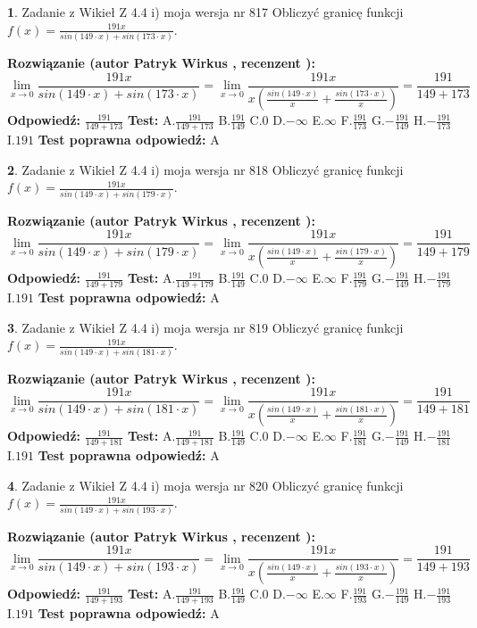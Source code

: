 \documentclass[12pt, a4paper]{article}
\theoremstyle{definition} %
\newtheorem{zad}{}
\newcommand{\zadStart}[1]{\begin{zad}#1\newline}
\newcommand{\zadStop}{\end{zad}}
\newcommand{\rozwStart}[2]{\noindent \textbf{Rozwiązanie (autor #1 , recenzent #2): }\newline}
\newcommand{\rozwStop}{\newline}
\newcommand{\odpStart}{\noindent \textbf{Odpowiedź:}\newline}
\newcommand{\odpStop}{\newline}
\newcommand{\testStart}{\noindent \textbf{Test:}\newline}
\newcommand{\testStop}{\newline}
\newcommand{\kluczStart}{\noindent \textbf{Test poprawna odpowiedź:}\newline}
\newcommand{\kluczStop}{\newline}
\begin{document}
\zadStart{Zadanie z Wikieł Z 4.4 i) moja wersja nr 817}
Obliczyć granicę funkcji $f(x)=\frac{191x}{sin(149\cdot x) +sin(173\cdot x)}$.
\zadStop
\rozwStart{Patryk Wirkus}{}
$$\lim\limits_{x\to 0}\frac{191x}{sin(149\cdot x) +sin(173\cdot x)}=\lim\limits_{x\to 0}\frac{191x}{x(\frac{sin(149\cdot x)}{x}+\frac{sin(173\cdot x)}{x})}=\frac{191}{149+173}$$
\rozwStop
\odpStart
$\frac{191}{149+173}$
\odpStop
\testStart
A.$\frac{191}{149+173}$
B.$\frac{191}{149}$
C.$0$
D.$-\infty$
E.$\infty$
F.$\frac{191}{173}$
G.$-\frac{191}{149}$
H.$-\frac{191}{173}$
I.$191$
\testStop
\kluczStart
A
\kluczStop



\zadStart{Zadanie z Wikieł Z 4.4 i) moja wersja nr 818}
Obliczyć granicę funkcji $f(x)=\frac{191x}{sin(149\cdot x) +sin(179\cdot x)}$.
\zadStop
\rozwStart{Patryk Wirkus}{}
$$\lim\limits_{x\to 0}\frac{191x}{sin(149\cdot x) +sin(179\cdot x)}=\lim\limits_{x\to 0}\frac{191x}{x(\frac{sin(149\cdot x)}{x}+\frac{sin(179\cdot x)}{x})}=\frac{191}{149+179}$$
\rozwStop
\odpStart
$\frac{191}{149+179}$
\odpStop
\testStart
A.$\frac{191}{149+179}$
B.$\frac{191}{149}$
C.$0$
D.$-\infty$
E.$\infty$
F.$\frac{191}{179}$
G.$-\frac{191}{149}$
H.$-\frac{191}{179}$
I.$191$
\testStop
\kluczStart
A
\kluczStop



\zadStart{Zadanie z Wikieł Z 4.4 i) moja wersja nr 819}
Obliczyć granicę funkcji $f(x)=\frac{191x}{sin(149\cdot x) +sin(181\cdot x)}$.
\zadStop
\rozwStart{Patryk Wirkus}{}
$$\lim\limits_{x\to 0}\frac{191x}{sin(149\cdot x) +sin(181\cdot x)}=\lim\limits_{x\to 0}\frac{191x}{x(\frac{sin(149\cdot x)}{x}+\frac{sin(181\cdot x)}{x})}=\frac{191}{149+181}$$
\rozwStop
\odpStart
$\frac{191}{149+181}$
\odpStop
\testStart
A.$\frac{191}{149+181}$
B.$\frac{191}{149}$
C.$0$
D.$-\infty$
E.$\infty$
F.$\frac{191}{181}$
G.$-\frac{191}{149}$
H.$-\frac{191}{181}$
I.$191$
\testStop
\kluczStart
A
\kluczStop



\zadStart{Zadanie z Wikieł Z 4.4 i) moja wersja nr 820}
Obliczyć granicę funkcji $f(x)=\frac{191x}{sin(149\cdot x) +sin(193\cdot x)}$.
\zadStop
\rozwStart{Patryk Wirkus}{}
$$\lim\limits_{x\to 0}\frac{191x}{sin(149\cdot x) +sin(193\cdot x)}=\lim\limits_{x\to 0}\frac{191x}{x(\frac{sin(149\cdot x)}{x}+\frac{sin(193\cdot x)}{x})}=\frac{191}{149+193}$$
\rozwStop
\odpStart
$\frac{191}{149+193}$
\odpStop
\testStart
A.$\frac{191}{149+193}$
B.$\frac{191}{149}$
C.$0$
D.$-\infty$
E.$\infty$
F.$\frac{191}{193}$
G.$-\frac{191}{149}$
H.$-\frac{191}{193}$
I.$191$
\testStop
\kluczStart
A
\kluczStop
\end{document}
